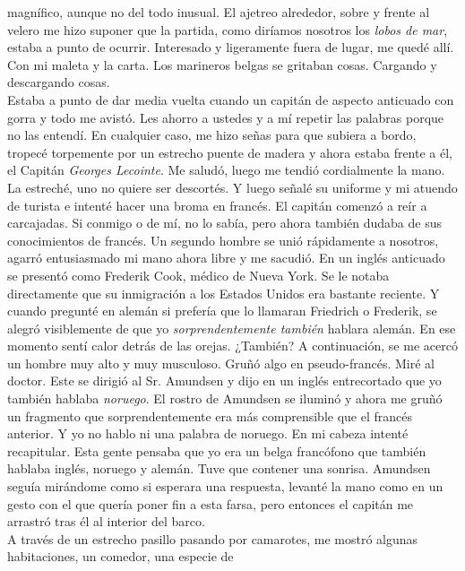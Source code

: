 \documentclass{article}
\begin{document}
    magnífico, aunque no del todo inusual. El ajetreo alrededor, sobre y frente al velero me hizo suponer que la
    partida, como diríamos nosotros los \textit{lobos de mar}, estaba a punto de ocurrir. Interesado y ligeramente
    fuera
    de lugar, me quedé allí. Con mi maleta y la carta. Los marineros belgas se gritaban cosas. Cargando y
    descargando
    cosas.\\
    \noindent Estaba a punto de dar media vuelta cuando un capitán de aspecto anticuado con gorra y todo me avistó. Les
    ahorro
    a ustedes y a mí repetir las palabras porque no las entendí. En cualquier caso, me hizo señas para que subiera a
    bordo, tropecé torpemente por un estrecho puente de madera y ahora estaba frente a él, el Capitán \textit{Georges
      Lecointe}. Me saludó, luego me tendió cordialmente la mano. La estreché, uno no quiere ser descortés. Y
    luego
    señalé su uniforme y mi atuendo de turista e intenté hacer una broma en francés. El capitán comenzó a reír a
    carcajadas. Si conmigo o de mí, no lo sabía, pero ahora también dudaba de sus conocimientos de francés. Un
    segundo
    hombre se unió rápidamente a nosotros, agarró entusiasmado mi mano ahora libre y me sacudió. En un inglés
    anticuado se presentó como Frederik Cook, médico de Nueva York. Se le notaba directamente que su inmigración a
    los
    Estados Unidos era bastante reciente. Y cuando pregunté en alemán si prefería que lo llamaran Friedrich o
    Frederik, se alegró visiblemente de que yo \textit{sorprendentemente también} hablara alemán. En ese momento sentí
    calor detrás de las orejas. ¿También? A continuación, se me acercó un hombre muy alto y muy musculoso. Gruñó
    algo
    en pseudo-francés. Miré al doctor. Este se dirigió al Sr. Amundsen y dijo en un inglés entrecortado que yo
    también
    hablaba \textit{noruego}. El rostro de Amundsen se iluminó y ahora me gruñó un fragmento que sorprendentemente era
    más comprensible que el francés anterior. Y yo no hablo ni una palabra de noruego. En mi cabeza intenté
    recapitular. Esta gente pensaba que yo era un belga francófono que también hablaba inglés, noruego y alemán.
    Tuve
    que contener una sonrisa. Amundsen seguía mirándome como si esperara una respuesta, levanté la mano como en un
    gesto con el que quería poner fin a esta farsa, pero entonces el capitán me arrastró tras él al interior del
    barco.\\
    \noindent A través de un estrecho pasillo pasando por camarotes, me mostró algunas habitaciones, un comedor, una especie
    de
\end{document}
